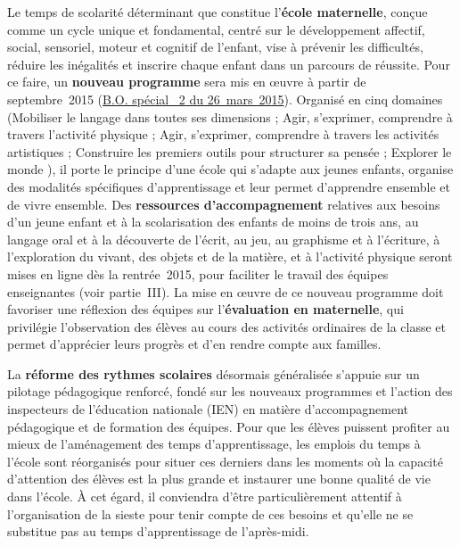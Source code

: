 Le temps de scolarité déterminant que constitue l’\textbf{école maternelle}, conçue comme un cycle unique et fondamental, centré sur le développement affectif, social, sensoriel, moteur et cognitif de l’enfant, vise à prévenir les difficultés, réduire les inégalités et inscrire chaque enfant dans un parcours de réussite. Pour ce faire, un \textbf{nouveau programme} sera mis en œuvre à partir de septembre~2015 (\href{http://www.education.gouv.fr/pid25535/bulletin_officiel.html?cid_bo=86940}{B.O. spécial \no{}~2 du 26~mars~2015}). Organisé en cinq domaines (\og Mobiliser le langage dans toutes ses dimensions \fg{} ; \og Agir, s’exprimer, comprendre à travers l’activité physique \fg{} ; \og Agir, s’exprimer, comprendre à travers les activités artistiques \fg{} ; \og Construire les premiers outils pour structurer sa pensée \fg{} ; \og Explorer le monde \fg{}), il porte le principe d’une école qui s’adapte aux jeunes enfants, organise des modalités spécifiques d’apprentissage et leur permet d’apprendre ensemble et de vivre ensemble. Des \textbf{ressources d’accompagnement} relatives aux besoins d’un jeune enfant et à la scolarisation des enfants de moins de trois ans, au langage oral et à la découverte de l’écrit, au jeu, au graphisme et à l’écriture, à l’exploration du vivant, des objets et de la matière, et à l’activité physique seront mises en ligne dès la rentrée~2015, pour faciliter le travail des équipes enseignantes (voir partie~III). La mise en œuvre de ce nouveau programme doit favoriser une réflexion des équipes sur l’\textbf{évaluation en maternelle}, qui privilégie l’observation des élèves au cours des activités ordinaires de la classe et permet d’apprécier leurs progrès et d’en rendre compte aux familles.

La \textbf{réforme des rythmes scolaires} désormais généralisée s’appuie sur un pilotage pédagogique renforcé, fondé sur les nouveaux programmes et l’action des inspecteurs de l’éducation nationale (IEN) en matière d’accompagnement pédagogique et de formation des équipes. Pour que les élèves puissent profiter au mieux de l’aménagement des temps d’apprentissage, les emplois du temps à l’école sont réorganisés pour situer ces derniers dans les moments où la capacité d’attention des élèves est la plus grande et instaurer une bonne qualité de vie dans l’école. À cet égard, il conviendra d’être particulièrement attentif à l’organisation de la sieste pour tenir compte de ces besoins et qu’elle ne se substitue pas au temps d’apprentissage de l’après-midi.

